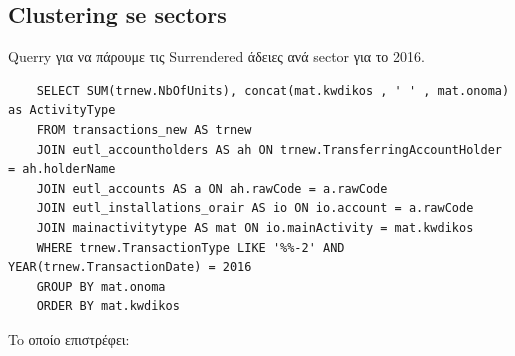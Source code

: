 \documentclass[a4paper,twoside,10pt]{article}
\begin{document}
\subsection{Clustering se sectors}
Querry για να πάρουμε τις Surrendered άδειες ανά sector για το 2016. 
\begin{verbatim}
	SELECT SUM(trnew.NbOfUnits), concat(mat.kwdikos , ' ' , mat.onoma) as ActivityType
	FROM transactions_new AS trnew
	JOIN eutl_accountholders AS ah ON trnew.TransferringAccountHolder = ah.holderName
	JOIN eutl_accounts AS a ON ah.rawCode = a.rawCode
	JOIN eutl_installations_orair AS io ON io.account = a.rawCode
	JOIN mainactivitytype AS mat ON io.mainActivity = mat.kwdikos
	WHERE trnew.TransactionType LIKE '%%-2' AND YEAR(trnew.TransactionDate) = 2016
	GROUP BY mat.onoma
	ORDER BY mat.kwdikos
\end{verbatim}
To οποίο επιστρέφει: \\ \\
\end{document}
